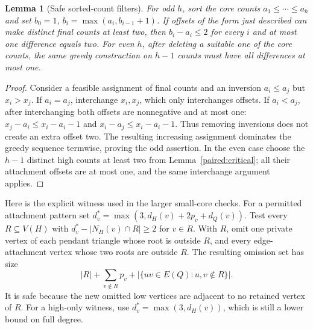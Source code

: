 \documentclass[11pt,a4paper]{article}
\newtheorem{lemma}[theorem]{Lemma}
\theoremstyle{definition}\newtheorem{definition}[theorem]{Definition}
\theoremstyle{remark}\newtheorem{remark}[theorem]{Remark}
\begin{document}
\begin{lemma}[Safe sorted-count filters]\label{paired:sorted-filter}
For odd $h$, sort the core counts $a_1\le\cdots\le a_h$ and set
$b_0=1$, $b_i=\max(a_i,b_{i-1}+1)$. If offsets of the form just
described can make distinct final counts at least two, then
$b_i-a_i\le2$ for every $i$ and at most one difference equals two.
For even $h$, after deleting a suitable one of the core counts, the
same greedy construction on $h-1$ counts must have all differences
at most one.
\end{lemma}
\begin{proof}
Consider a feasible assignment of final counts and an inversion
$a_i\le a_j$ but $x_i>x_j$. If $a_i=a_j$, interchange $x_i,x_j$,
which only interchanges offsets. If $a_i<a_j$, after interchanging
both offsets are nonnegative and at most one: $x_j-a_i\le x_i-a_i-1$
and $x_i-a_j\le x_i-a_i-1$. Thus removing inversions does not create
an extra offset two. The resulting increasing assignment dominates
the greedy sequence termwise, proving the odd assertion. In the
even case choose the $h-1$ distinct high counts at least two from
Lemma~\ref{paired:critical}; all their attachment offsets are at most
one, and the same interchange argument applies.
\end{proof}

Here is the explicit witness used in the larger small-core checks.
For a permitted attachment pattern set
$d_v^*=\max(3,d_H(v)+2p_v+d_Q(v))$. Test every $R\subseteq V(H)$
with $d_v^*-|N_H(v)\cap R|\ge2$ for $v\in R$. With $R$, omit one
private vertex of each pendant triangle whose root is outside $R$,
and every edge-attachment vertex whose two roots are outside $R$.
The resulting omission set has size
\begin{equation}\label{paired:kernel-witness}
 |R|+\sum_{v\notin R}p_v+
 |\{uv\in E(Q):u,v\notin R\}|.
\end{equation}
It is safe because the new omitted low vertices are adjacent to no
retained vertex of $R$. For a high-only witness, use
$d_v^*=\max(3,d_H(v))$, which is still a lower bound on full degree.
\end{document}
